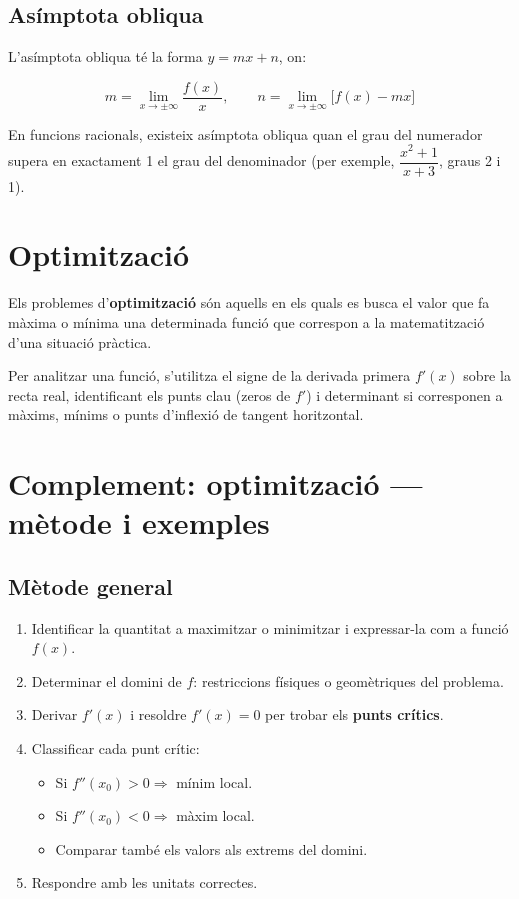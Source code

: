 \subsection{Asímptota obliqua}

L'asímptota obliqua té la forma $y = mx + n$, on:

\begin{equation*}
m = \lim_{x\to\pm\infty} \frac{f(x)}{x}, \qquad n = \lim_{x\to\pm\infty}\bigl[f(x) - mx\bigr]
\end{equation*}

En funcions racionals, existeix asímptota obliqua quan el grau del numerador supera en exactament 1 el grau del denominador (per exemple, $\dfrac{x^2+1}{x+3}$, graus 2 i 1).

\section{Optimització}

Els problemes d'\textbf{optimització} són aquells en els quals es busca el valor que fa màxima o mínima una determinada funció que correspon a la matematització d'una situació pràctica.

Per analitzar una funció, s'utilitza el signe de la derivada primera $f'(x)$ sobre la recta real, identificant els punts clau (zeros de $f'$) i determinant si corresponen a màxims, mínims o punts d'inflexió de tangent horitzontal.

\section{Complement: optimització --- mètode i exemples}

\subsection{Mètode general}

\begin{enumerate}
\item Identificar la quantitat a maximitzar o minimitzar i expressar-la com a funció $f(x)$.
\item Determinar el domini de $f$: restriccions físiques o geomètriques del problema.
\item Derivar $f'(x)$ i resoldre $f'(x) = 0$ per trobar els \textbf{punts crítics}.
\item Classificar cada punt crític:
\begin{itemize}
\item Si $f''(x_0) > 0 \Rightarrow$ mínim local.
\item Si $f''(x_0) < 0 \Rightarrow$ màxim local.
\item Comparar també els valors als extrems del domini.
\end{itemize}
\item Respondre amb les unitats correctes.
\end{enumerate}

